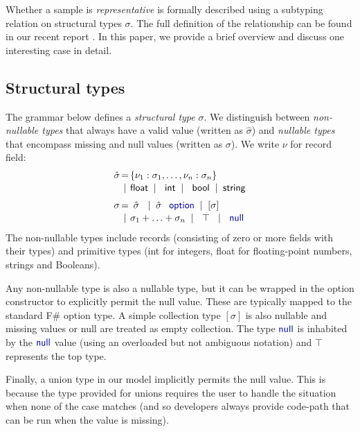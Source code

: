 \documentclass[preprint]{sigplanconf}
\newcommand{\kvd}[1]{\textnormal{\textcolor{kvdclr}{\sffamily #1}}}
\newcommand{\ident}[1]{\textnormal{\sffamily #1}}
\newcommand{\lsep}[0]{\;\; | \;\;}
\newcommand{\narrow}[1]{\hspace{-0.85em} #1 \hspace{-0.85em}}
\begin{document}
Whether a sample is \emph{representative} is formally described using a subtyping relation
on structural types $\sigma$. The full definition of the relationship can be found in our recent
report \cite{fsharp-data-paper}. In this paper, we provide a brief overview and discuss one
interesting case in detail.

\subsection{Structural types}
\label{sec:inference-types}

The grammar below defines a \emph{structural type} $\sigma$. We distinguish between \emph{non-nullable types}
that always have a valid value (written as $\hat{\sigma}$) and \emph{nullable types} that encompass missing
and \kvd{null} values (written as $\sigma$). We write $\nu$ for record field:
%
\begin{equation*}
\begin{array}{rcl}
 \hat{\sigma} &\narrow{=}& \{ \nu_1 : \sigma_1, \ldots, \nu_n : \sigma_n \} \\[0.1em]
              &\narrow{|}& \ident{float} \lsep \ident{int} \lsep \ident{bool} \lsep \ident{string}
 \\[0.6em]
       \sigma &\narrow{=}& ~\hat{\sigma}~ \lsep \hat{\sigma}\;\,\kvd{option} \lsep [\sigma] \\[0.1em]
              &\narrow{|}& \sigma_1 + \ldots + \sigma_n \lsep ~\top~ \lsep \kvd{null}
\end{array}
\end{equation*}
%
The non-nullable types include records (consisting of zero or more fields with their types) and
primitive types (\ident{int} for integers, \ident{float} for floating-point numbers, strings and
Booleans).

Any non-nullable type is also a nullable type, but it can be wrapped in the \kvd{option}
constructor to explicitly permit the \kvd{null} value. These are typically mapped to the standard
F\# option type. A simple collection type $[\sigma]$ is also nullable and missing values or
\kvd{null} are treated as empty collection. The type $\kvd{null}$ is inhabited by the $\kvd{null}$
value (using an overloaded but not ambiguous notation) and $\top$ represents the top type.

Finally, a union type in our model implicitly permits the \kvd{null} value. This is because the
type provided for unions requires the user to handle the situation when none of the case matches
(and so developers always provide code-path that can be run when the value is missing).
\end{document}
